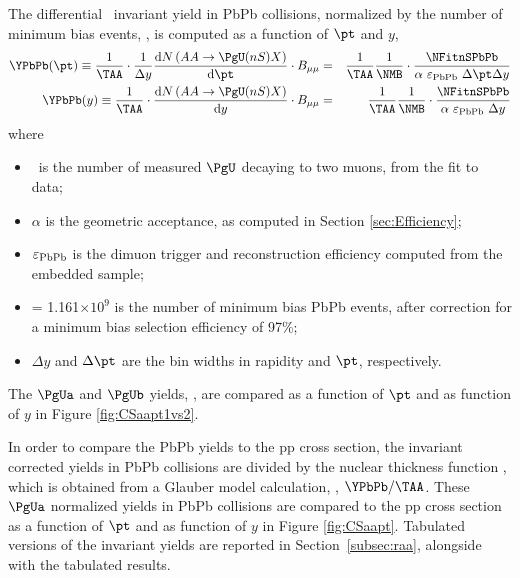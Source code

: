 The  differential \PgU\ invariant yield %
 in PbPb collisions, normalized 
 by the number of minimum bias events, \NMB,
 is
computed as a function of $\pt$ and $y$,
\begin{eqnarray} 
\label{eq:nypt}
\YPbPb(\pt) \equiv \dfrac{1}{\TAA} \cdot \dfrac{1}{\Delta y} \dfrac{\text{d}N\left( AA\rightarrow
 \PgU(nS)X\right)}{\text{d}\pt} \cdot B_{\mu\mu} &=&
 \dfrac{1}{\TAA}
 \dfrac{1}{\NMB}\cdot\dfrac{\NFitnSPbPb}{\alpha\ \varepsilon_{\rm PbPb}\
 \Delta \pt\Delta y} \\
\label{eq:nyrap}
\YPbPb(y) \equiv  \dfrac{1}{\TAA} \cdot \dfrac{\text{d}N\left( AA\rightarrow
 \PgU(nS)X\right)}{\text{d}y} \cdot B_{\mu\mu} &=&
 \dfrac{1}{\TAA} 
  \dfrac{1}{\NMB} \cdot \dfrac{\NFitnSPbPb}{\alpha\ \varepsilon_{\rm PbPb}\ \Delta y} 
 \end{eqnarray}    
% 
where
\begin{itemize}
\item{\NFitnSPbPb\ is the number of measured $\PgU$ decaying to
two muons, from the fit
to data;}
\item{$\alpha$ is the geometric acceptance, as computed in Section
\ref{sec:Efficiency};}
\item{$\varepsilon_{\rm PbPb}$ is the dimuon trigger and reconstruction
efficiency computed from the embedded sample;}
\item{\NMB = 1.161$\times 10^{9}$ is the number of minimum bias
PbPb events, after correction for a minimum bias selection efficiency
of 97\%;}
\item{$\Delta y$ and $\Delta \pt$ are the bin widths in rapidity and
$\pt$, respectively.}
\end{itemize}

The  $\PgUa$ and $\PgUb$  yields, \YPbPb, are compared as a function of $\pt$  and as function of $y$ in Figure \ref{fig:CSaapt1vs2}.%

In order to compare the PbPb yields to the pp cross section, the
invariant corrected yields in PbPb collisions are divided by the
nuclear thickness
function \TAA, which is obtained from a Glauber model calculation,
\ie, $\YPbPb/\TAA$. These $\PgUa$ normalized yields in PbPb collisions
are compared to the pp cross section as a function of $\pt$  and as function of $y$
in Figure \ref{fig:CSaapt}.%
 Tabulated versions of the invariant yields
are reported in Section~\ref{subsec:raa}, alongside with the tabulated
\RAA results.
\vfill\newpage

